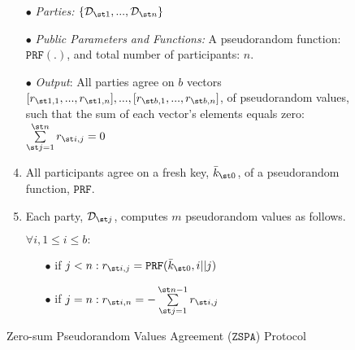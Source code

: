 \begin{figure}[ht]
\setlength{\fboxsep}{0.7pt}
\begin{center}
\begin{boxedminipage}{12.3cm}

\small{

\begin{enumerate}
\item[$\bullet$]  \textit{Parties:} $\{\mathcal{D}_{\st 1},..., \mathcal{D}_{\st n}\}$
\item[$\bullet$]  \textit{Public Parameters and Functions:} A pseudorandom function: $\mathtt{PRF}(.)$, and total number of participants: $n$. 
\item[$\bullet$] \textit{Output}:  All parties agree on $b$ vectors $[r_{\st 1,1},..., r_{\st 1,n}],...,[r_{\st b,1},..., r_{\st b,n}]$, of pseudorandom values, such that the sum of each vector's elements equals zero: $\sum\limits^{\st n}_{\st j=1} r_{\st i,j}=0$


\item All participants agree on a fresh key, $\bar k_{\st 0}$, of a pseudorandom function, $\mathtt{PRF}$. 

\item\label{ZSPA:val-gen} Each party, $\mathcal{D}_{\st j}$, computes $m$ pseudorandom values as follows. 

$\forall i, 1\leq i\leq b:$
 
\begin{itemize}
\item[$\bullet$] if $j< n: r_{\st i,j}=\mathtt{PRF}(\bar k_{\st 0}, i||j)$ 
%
\item[$\bullet$]  if $j=n: r_{\st i, n}=-\sum\limits^{\st n-1}_{\st j=1} r_{\st i,j}$
\end{itemize}



%
%
%
 \end{enumerate}
}
\end{boxedminipage}
\end{center}
\caption{Zero-sum Pseudorandom Values Agreement ($\mathtt{ZSPA}$) Protocol} 
\label{fig:ZSPA}
\end{figure}


